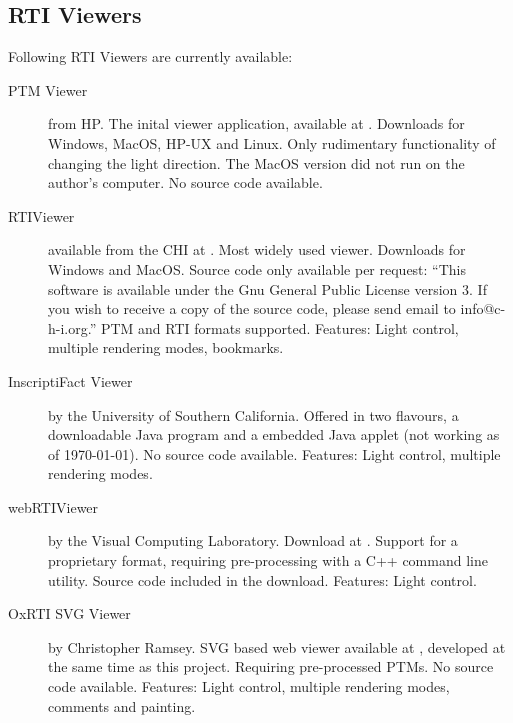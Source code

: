 \subsection{RTI Viewers}
Following RTI Viewers are currently available:
\begin{description}
\item[PTM Viewer]  from HP. The inital viewer application, available at
  \cite*{noauthor_hp_nodate}. Downloads for Windows, MacOS, HP-UX and Linux.
  Only rudimentary functionality of changing the light direction. The MacOS
  version did not run on the author's computer. No source code available.
\item[RTIViewer] available from the CHI at \cite*{noauthor_cultural_nodate-1}.
  Most widely used viewer. Downloads for Windows and MacOS\@. Source code only available per request:
  ``This software is available under the Gnu General Public License version 3.
  If you wish to receive a copy of the source code, please send email to
  info@c-h-i.org.'' PTM and RTI formats supported. Features: Light control, multiple rendering
  modes, bookmarks.
\item[InscriptiFact Viewer] by the University of Southern California. Offered in two flavours, a downloadable Java
  program\cite*{noauthor_inscriptifact_nodate-1} and a embedded Java
  applet\cite*{noauthor_inscriptifact_nodate} (not working as of \today). No
  source code available. Features: Light control, multiple rendering modes.
\item[webRTIViewer] by the Visual Computing Laboratory. Download at
  \cite*{noauthor_reflectance_nodate}. Support for a proprietary format,
  requiring pre-processing with a C++ command line utility. Source code
  included in the download. Features: Light control.
\item[OxRTI SVG Viewer] by Christopher Ramsey. SVG based web viewer available at
  \cite*{noauthor_oxrti_nodate}, developed at the same time as this project.
  Requiring pre-processed PTMs. No source code available. Features: Light control, multiple rendering modes,
  comments and painting.
\end{description}
